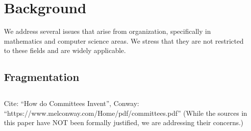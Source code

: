 \chapter{Background}
\label{ch:background}
We address several issues that arise from organization, specifically in mathematics and computer science areas. We stress that they are not restricted to these fields and are widely applicable.

\section*[fragmentation]{Fragmentation}


\section*[Limitations in Extensions]{}

Cite: ``How do Committees Invent'', Conway: ``https://www.melconway.com/Home/pdf/committees.pdf'' (While the sources in this paper have NOT been formally justified, we are addressing their concerns.)





